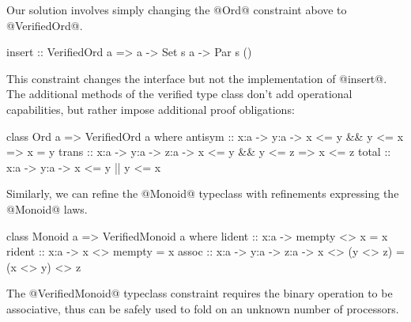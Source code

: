 %
Our solution involves simply changing the @Ord@ constraint above to
@VerifiedOrd@.
%
\begin{mcode}
    insert :: VerifiedOrd a => a -> Set s a -> Par s ()
\end{mcode}
%
This constraint changes the interface but not the implementation of @insert@.
%
%
The additional methods of the verified type class don't add operational
capabilities, but rather impose additional proof obligations:

\begin{code}
    class Ord a => VerifiedOrd a where
      antisym :: x:a -> y:a -> { x <= y && y <= x => x = y }
      trans   :: x:a -> y:a -> z:a -> { x <= y && y <= z => x <= z }
      total   :: x:a -> y:a -> { x <= y || y <= x }
\end{code}


%
Similarly, we can refine the @Monoid@ typeclass with refinements
expressing the @Monoid@ laws.
%
\begin{code}
    class Monoid a => VerifiedMonoid a where
      lident :: x:a -> { mempty <> x = x }
      rident :: x:a -> { x <> mempty = x }
      assoc  :: x:a -> y:a -> z:a -> { x <> (y <> z) = (x <> y) <> z }
\end{code}
The @VerifiedMonoid@ typeclass constraint requires the binary operation
to be associative, thus can be safely used to fold on
an unknown number of processors.




